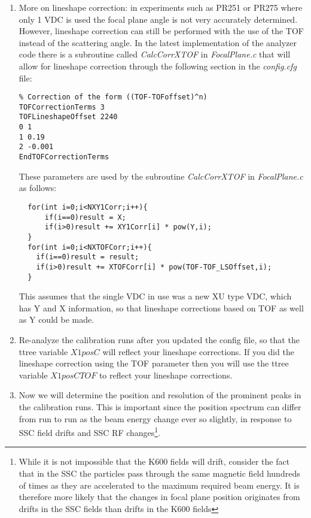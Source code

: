 \documentclass[11pt]{report}
\begin{document}
\begin{enumerate}
\bigskip

\item
More on lineshape correction: in experiments such as PR251 or PR275 where only 1 VDC is used the focal plane angle is not
very accurately determined. However, lineshape correction can still be performed with the use of the TOF instead
of the scattering angle.
In the latest implementation of the analyzer code there is a subroutine called {\it CalcCorrXTOF} in 
{\it FocalPlane.c} 
that will allow for lineshape correction through the following section in the {\it config.cfg} file:
\begin{verbatim} 
% Correction of the form ((TOF-TOFoffset)^n)
TOFCorrectionTerms 3
TOFLineshapeOffset 2240
0 1
1 0.19
2 -0.001
EndTOFCorrectionTerms
\end{verbatim}
These parameters are used by the subroutine {\it CalcCorrXTOF} in {\it FocalPlane.c} as follows: 
\begin{verbatim} 
  for(int i=0;i<NXY1Corr;i++){
      if(i==0)result = X;
      if(i>0)result += XY1Corr[i] * pow(Y,i);
  }
  for(int i=0;i<NXTOFCorr;i++){
    if(i==0)result = result;
    if(i>0)result += XTOFCorr[i] * pow(TOF-TOF_LSOffset,i);
  }
\end{verbatim}
This assumes that the single VDC in use was a new XU type VDC, 
which has Y and X information, so that lineshape corrections based on
TOF as well as Y could be made.

\item 
Re-analyze the calibration runs after you updated the config file, so that the ttree variable $X1posC$ will 
reflect your lineshape corrections. If you did the lineshape correction using the TOF parameter then you will use
the ttree variable $X1posCTOF$ to reflect your lineshape corrections.

\item Now we will determine the position and resolution of the prominent peaks in the calibration runs.
This is important since the position spectrum can differ from run to run as the beam energy change ever so slightly,
in response to SSC field drifts and SSC RF changes\footnote{While it is not impossible that the K600 fields will 
drift, consider the fact that in the SSC the particles pass through the same magnetic field hundreds of times as 
they are accelerated to the maximum required beam energy. It is therefore more likely that the changes in focal 
plane position originates from drifts in the SSC fields than drifts in the K600 fields}.


\end{enumerate}
\end{document}
